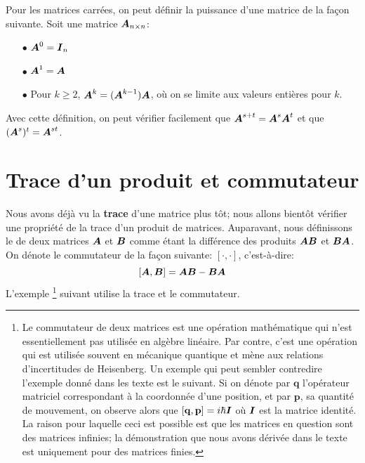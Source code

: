  Pour les matrices carrées, on peut définir la puissance d'une matrice de la façon suivante.  Soit
 une matrice $\boldsymbol{A}_{n \times n}$:
 \begin{itemize}
 \item[$\bullet$] $\boldsymbol{A}^0 = \boldsymbol{I}_n$
 \item[$\bullet$] $\boldsymbol{A}^1 = \boldsymbol{A}$
  \item[$\bullet$] Pour $k\geq 2$, $\boldsymbol{A}^k = (\boldsymbol{A}^{k-1}) \boldsymbol{A}$, où on se limite aux valeurs entières pour $k$.
 \end{itemize}
 Avec cette définition, on peut vérifier facilement que $\boldsymbol{A}^{s+t} = \boldsymbol{A}^s \boldsymbol{A}^t$ et que
 $(\boldsymbol{A}^s)^t = \boldsymbol{A}^{st}$.
 
 \section{Trace d'un produit et commutateur}
 Nous avons déjà vu la \textbf{trace} d'une matrice plus tôt; nous allons bientôt vérifier une propriété de la
 trace d'un produit de matrices.  Auparavant, nous définissons le  de deux matrices
 $\boldsymbol{A}$ et $\boldsymbol{B}$ comme étant la différence des produits $\boldsymbol{A}\boldsymbol{B}$ et $\boldsymbol{B}\boldsymbol{A}$.  On dénote le commutateur de la
 façon suivante: $[\cdot, \cdot]$, c'est-à-dire:
 \[
 [\boldsymbol{A},\boldsymbol{B}] = \boldsymbol{A}\boldsymbol{B} - \boldsymbol{B}\boldsymbol{A}
 \]
 L'exemple
 \footnote{Le commutateur de deux matrices est une opération mathématique qui n'est essentiellement pas
 utilisée en algèbre linéaire.  Par contre, c'est une opération qui est utilisée souvent en mécanique
 quantique et mène aux relations d'incertitudes de Heisenberg.  Un exemple qui peut sembler
 contredire l'exemple donné dans les texte est le suivant.  Si on dénote par $\mathbf{q}$ l'opérateur matriciel
 correspondant à la coordonnée d'une position, et par $\mathbf{p}$, sa quantité de mouvement, on observe alors que
 $\displaystyle [\mathbf{q}, \mathbf{p}] = i\hbar \mathbf{\boldsymbol{I}}$ où $\mathbf{\boldsymbol{I}}$ est la matrice identité. 
 La raison pour laquelle ceci est possible est que les matrices en question sont des matrices infinies; la
 démonstration que nous avons dérivée dans le texte est uniquement pour des matrices finies.}
 suivant utilise la trace et le commutateur.
